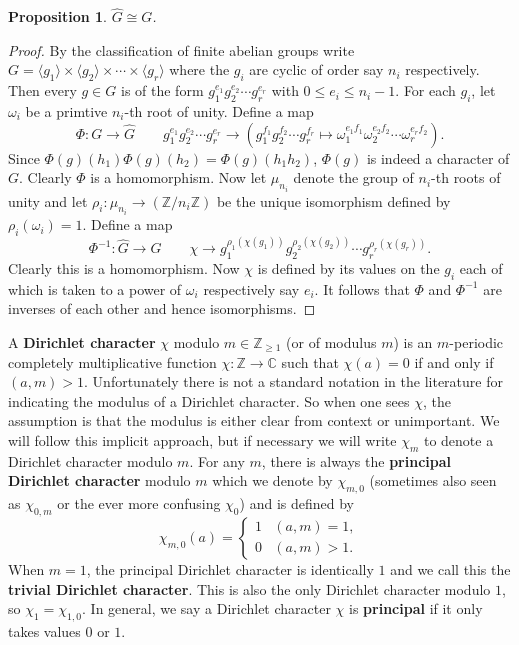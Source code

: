 \documentclass[12pt]{book}
\newtheorem{proposition}{Proposition}[section]
\theoremstyle{definition}\newframedtheorem{method}{Method}
\newcommand{\Z}{\mathbb{Z}}
\newcommand{\C}{\mathbb{C}}
\newcommand{\w}{\omega}
\newcommand{\x}{\times}
\newcommand{\<}{\langle}
\renewcommand{\>}{\rangle}
\newcommand{\what}{\widehat}
\begin{document}
    \begin{proposition}\label{prop:dual_character_isomorphism}
      $\what{G} \cong G$.
    \end{proposition}
    \begin{proof}
      By the classification of finite abelian groups write $G = \<g_{1}\> \x \<g_{2}\> \x \cdots \x \<g_{r}\>$ where the $g_{i}$ are cyclic of order say $n_{i}$ respectively. Then every $g \in G$ is of the form $g_{1}^{e_{1}}g_{2}^{e_{2}} \cdots g_{r}^{e_{r}}$ with $0 \le e_{i} \le n_{i}-1$. For each $g_{i}$, let $\w_{i}$ be a primtive $n_{i}$-th root of unity. Define a map
      \[
        \Phi:G \to \what{G} \qquad g_{1}^{e_{1}}g_{2}^{e_{2}} \cdots g_{r}^{e_{r}} \to \left(g_{1}^{f_{1}}g_{2}^{f_{2}} \cdots g_{r}^{f_{r}} \mapsto \w_{1}^{e_{1}f_{1}}\w_{2}^{e_{2}f_{2}} \cdots \w_{r}^{e_{r}f_{2}} \right).
      \]
      Since $\Phi(g)(h_{1})\Phi(g)(h_{2}) = \Phi(g)(h_{1}h_{2})$, $\Phi(g)$ is indeed a character of $G$. Clearly $\Phi$ is a homomorphism. Now let $\mu_{n_{i}}$ denote the group of $n_{i}$-th roots of unity and let $\rho_{i}:\mu_{n_{i}} \to (\Z/n_{i}\Z)$ be the unique isomorphism defined by $\rho_{i}(\w_{i}) = 1$. Define a map
      \[
        \Phi^{-1}:\what{G} \to G \qquad \chi \to g_{1}^{\rho_{1}(\chi(g_{1}))}g_{2}^{\rho_{2}(\chi(g_{2}))} \cdots g_{r}^{\rho_{r}(\chi(g_{r}))}.
      \]
      Clearly this is a homomorphism. Now $\chi$ is defined by its values on the $g_{i}$ each of which is taken to a power of $\w_{i}$ respectively say $e_{i}$. It follows that $\Phi$ and $\Phi^{-1}$ are inverses of each other and hence isomorphisms.
    \end{proof}

    A \textbf{Dirichlet character} $\chi$ modulo $m \in \Z_{\ge 1}$ (or of modulus $m$) is an $m$-periodic completely multiplicative function $\chi:\Z \to \C$ such that $\chi(a) = 0$ if and only if $(a,m) > 1$. Unfortunately there is not a standard notation in the literature for indicating the modulus of a Dirichlet character. So when one sees $\chi$, the assumption is that the modulus is either clear from context or unimportant. We will follow this implicit approach, but if necessary we will write $\chi_{m}$ to denote a Dirichlet character modulo $m$. For any $m$, there is always the \textbf{principal Dirichlet character} modulo $m$ which we denote by $\chi_{m,0}$ (sometimes also seen as $\chi_{0,m}$ or the ever more confusing $\chi_{0}$) and is defined by
    \[
      \chi_{m,0}(a) = \begin{cases} 1 & (a,m) = 1, \\ 0 & (a,m) > 1. \end{cases}
    \]
    When $m = 1$, the principal Dirichlet character is identically $1$ and we call this the \textbf{trivial Dirichlet character}. This is also the only Dirichlet character modulo $1$, so $\chi_{1} = \chi_{1,0}$. In general, we say a Dirichlet character $\chi$ is \textbf{principal} if it only takes values $0$ or $1$.
\end{document}
